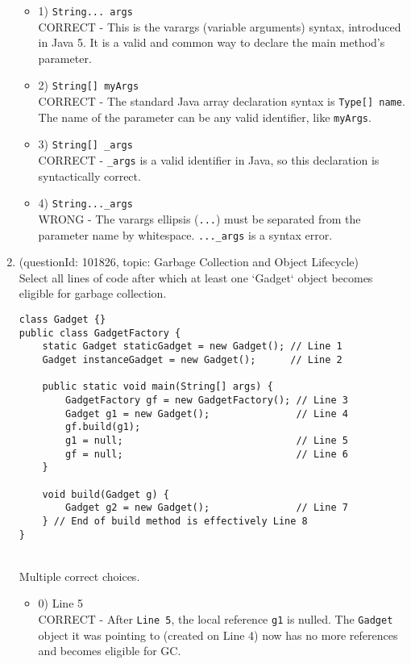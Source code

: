 \documentclass[12pt]{article}
\begin{document}
\begin{enumerate}[label=(\arabic*)]
\begin{itemize}
\item 1) \verb|String... args|
 \\ 
CORRECT - This is the varargs (variable arguments) syntax, introduced in Java 5. It is a valid and common way to declare the main method's parameter.

\item 2) \verb|String[] myArgs|
 \\ 
CORRECT - The standard Java array declaration syntax is \verb|Type[] name|. The name of the parameter can be any valid identifier, like \verb|myArgs|.

\item 3) \verb|String[] _args|
 \\ 
CORRECT - \verb|_args| is a valid identifier in Java, so this declaration is syntactically correct.

\item 4) \verb|String..._args|
 \\ 
WRONG - The varargs ellipsis (\verb|...|) must be separated from the parameter name by whitespace. \verb|..._args| is a syntax error.

\end{itemize}
\item (questionId: 101826, topic: Garbage Collection and Object Lifecycle) \\ 
Select all lines of code after which at least one `Gadget` object becomes eligible for garbage collection.
\begin{verbatim}
class Gadget {}
public class GadgetFactory {
    static Gadget staticGadget = new Gadget(); // Line 1
    Gadget instanceGadget = new Gadget();      // Line 2

    public static void main(String[] args) {
        GadgetFactory gf = new GadgetFactory(); // Line 3
        Gadget g1 = new Gadget();               // Line 4
        gf.build(g1);
        g1 = null;                              // Line 5
        gf = null;                              // Line 6
    }

    void build(Gadget g) {
        Gadget g2 = new Gadget();               // Line 7
    } // End of build method is effectively Line 8
}
\end{verbatim}
\\ \noindent Multiple correct choices. 
\begin{itemize}
\item 0) Line 5
 \\ 
CORRECT - After \verb|Line 5|, the local reference \verb|g1| is nulled. The \verb|Gadget| object it was pointing to (created on Line 4) now has no more references and becomes eligible for GC.


\end{itemize}
\end{enumerate}
\end{document}

